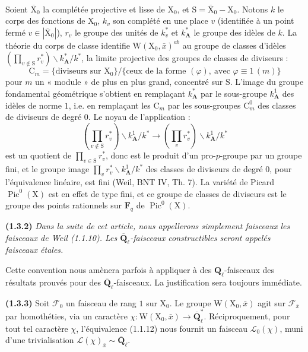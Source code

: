 \documentclass[11pt,leqno]{article}
\newcommand{\Page}[1]{\ifvmode\noindent\else\unskip\ \fi{\footnotesize\textcolor{gray}{[p.\,#1]}}\ \ignorespaces}
\begin{document}
\Page{157}

Soient \(\overline{\mathrm{X}}_0\) la complétée projective et lisse de \(\mathrm{X}_0\), et \(\mathrm{S}=\overline{\mathrm{X}}_0-\mathrm{X}_0\). Notons \(k\) le corps des fonctions de \(\mathrm{X}_0\), \(k_v\) son complété en une place \(v\) (identifiée à un point fermé \(v\in|\overline{\mathrm{X}}_0|\)), \(r_v\) le groupe des unités de \(k_v^*\) et \(k_{\mathbf{A}}^*\) le groupe des idèles de \(k\). La théorie du corps de classe identifie \(\mathrm{W}(\mathrm{X}_0,\bar{x})^{ab}\) au groupe de classes d’idèles \((\prod\limits_{v\notin\mathrm{S}}r_v^*)\backslash k_{\mathbf{A}}^*/k^*\), la limite projective des groupes de classes de diviseurs :
\[
\mathrm{C}_m
=\{\text{diviseurs sur }\mathrm{X}_0\}/
 \{\text{ceux de la forme }(\varphi),\ \text{avec }\varphi\equiv1\,(m)\}
\]
pour \(m\) un « module » de plus en plus grand, concentré sur \(\mathrm{S}\). L’image du groupe fondamental géométrique s’obtient en remplaçant \(k_{\mathbf{A}}^*\) par le sous-groupe \(k_{\mathbf{A}}^1\) des idèles de norme \(1\), i.e. en remplaçant les \(\mathrm{C}_m\) par les sous-groupes \(\mathrm{C}_m^0\) des classes de diviseurs de degré \(0\). Le noyau de l’application :
\[
(\prod_{v\notin\mathrm{S}}r_v^*)\backslash k_{\mathbf{A}}^1/k^*
\longrightarrow
(\prod_v r_v^*)\backslash k_{\mathbf{A}}^1/k^*
\]
est un quotient de \(\prod\limits_{v\in\mathrm{S}}r_v^*\), donc est le produit d’un pro-\(p\)-groupe par un groupe fini, et le groupe image \(\prod\limits_v r_v^*\backslash k_{\mathbf{A}}^1/k^*\) des classes de diviseurs de degré \(0\), pour l’équivalence linéaire, est fini (Weil, BNT IV, Th. 7). La variété de Picard \(\operatorname{Pic}^0(\mathrm{X})\) est en effet de type fini, et ce groupe de classes de diviseurs est le groupe des points rationnels sur \(\mathbf{F}_q\) de \(\operatorname{Pic}^0(\mathrm{X})\).

\textbf{(1.3.2)} \textit{Dans la suite de cet article, nous appellerons simplement \textup{faisceaux} les faisceaux de Weil \textup{(1.1.10)}. Les \(\overline{\mathbf{Q}}_\ell\)-faisceaux constructibles seront appelés \textup{faisceaux étales}.}

Cette convention nous amènera parfois à appliquer à des \(\mathbf{Q}_\ell\)-faisceaux des résultats prouvés pour des \(\overline{\mathbf{Q}}_\ell\)-faisceaux. La justification sera toujours immédiate.

\textbf{(1.3.3)} Soit \(\mathscr{F}_0\) un faisceau de rang \(1\) sur \(\mathrm{X}_0\). Le groupe \(\mathrm{W}(\mathrm{X}_0,\bar{x})\) agit sur \(\mathscr{F}_{\bar{x}}\) par homothéties, via un caractère \(\chi:\mathrm{W}(\mathrm{X}_0,\bar{x})\to\overline{\mathbf{Q}}_\ell^*\). Réciproquement, pour tout tel caractère \(\chi\), l’équivalence (1.1.12) nous fournit un faisceau \(\mathscr{L}_0(\chi)\), muni d’une trivialisation \(\mathscr{L}(\chi)_{\bar{x}}\sim\overline{\mathbf{Q}}_\ell\).
\end{document}
